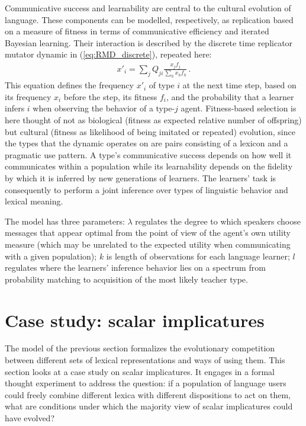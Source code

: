\documentclass[a4paper, 11pt]{article}
\theoremstyle{Satz}
\begin{document}
Communicative success and learnability are central to the cultural evolution of language. These
components can be modelled, respectively, as replication based on a measure of fitness in terms
of communicative efficiency and iterated Bayesian learning. Their interaction is described by
the discrete time replicator mutator dynamic in (\ref{eq:RMD_discrete}), repeated here:
\begin{align*}
  x'_i = \sum_j Q_{ji} \frac{x_jf_j}{\sum_h x_h f_h}\,.
\end{align*}
This equation defines the frequency $x'_i$ of type $i$ at the next time step, based on its
frequency $x_i$ before the step, its fitness $f_i$, and the probability that a learner infers
$i$ when observing the behavior of a type-$j$ agent. Fitness-based selection is here thought of
not as biological (fitness as expected relative number of offspring) but cultural (fitness as
likelihood of being imitated or repeated) evolution, since the types that the dynamic operates
on are pairs consisting of a lexicon and a pragmatic use pattern. A type's communicative success depends
on how well it communicates within a population while its learnability depends on the
fidelity by which it is inferred by new generations of learners. The learners' task is
consequently to perform a joint inference over types of linguistic behavior and lexical
meaning.

The model has three parameters: $\lambda$ regulates the degree to which speakers
choose messages that appear optimal from the point of view of the agent's own utility measure
(which may be unrelated to the expected utility when communicating with a given population);
$k$ is length of observations for each language learner; $l$ regulates where the learners'
inference behavior lies on a spectrum from probability matching to acquisition of the most likely
teacher type.





\section{Case study: scalar implicatures}
\label{sec:si-case-study}

The model of the previous section formalizes the evolutionary competition between different
sets of lexical representations and ways of using them. This section looks at a case study on
scalar implicatures. It engages in a formal thought experiment to address the
question: if a population of language users could freely combine different lexica with
different dispositions to act on them, what are conditions under which the majority view of scalar
implicatures could have evolved?
\end{document}
